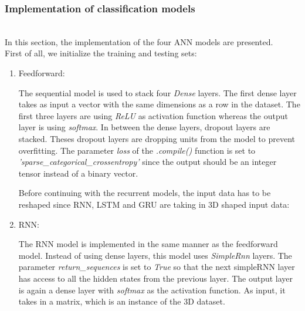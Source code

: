 \subsubsection{Implementation of classification models}\label{implementation}~\\

In this section, the implementation of the four ANN models are presented.\\

First of all, we initialize the training and testing sets:


\begin{enumerate}[label=\arabic*.]
  \item Feedforward:
    
    The sequential model is used to stack four \textit{Dense} layers. The first
    dense layer takes as input a vector with the same dimensions as a row in the
    dataset. The first three layers are using \textit{ReLU} as activation
    function whereas the output layer is using \textit{softmax}. In between the
    dense layers, dropout layers are stacked. Theses dropout layers are dropping
    units from the model to prevent overfitting. The parameter \textit{loss} of
    the \textit{.compile()} function is set to
    \textit{'sparse\_categorical\_crossentropy'} since the output should be an
    integer tensor instead of a binary vector.\\

  \begin{normalize}
    Before continuing with the recurrent models, the input data has to be
    reshaped since RNN, LSTM and GRU are taking in 3D shaped input data:

    
  \end{normalize}

  \item RNN:
    
    The RNN model is implemented in the same manner as the feedforward model.
    Instead of using dense layers, this model uses \textit{SimpleRnn} layers.
    The parameter \textit{return\_sequences} is set to \textit{True} so that the
    next simpleRNN layer has access to all the hidden states from the previous
    layer.  The output layer is again a dense layer with \textit{softmax} as the
    activation function. As input, it takes in a matrix, which is an instance of
    the 3D dataset.~\\


\end{enumerate}
